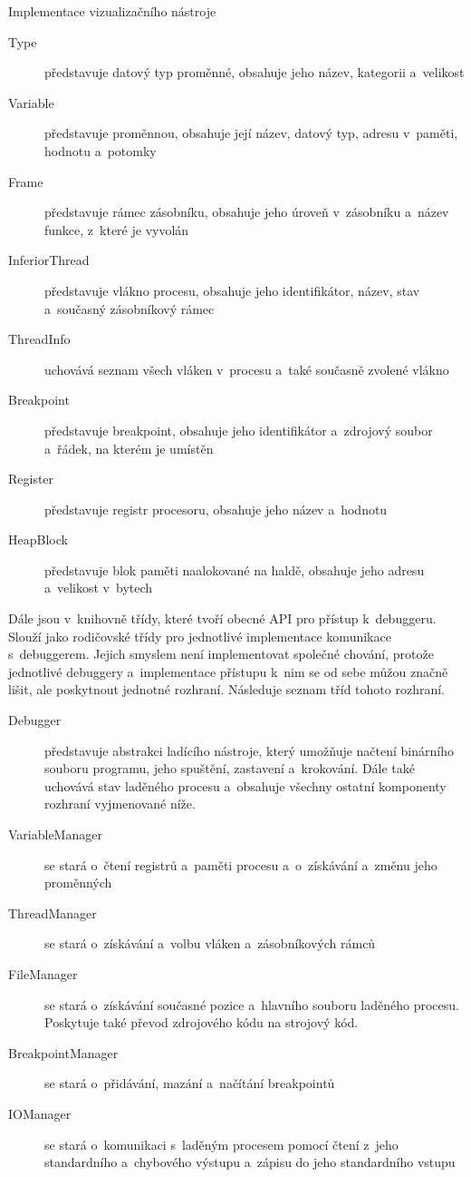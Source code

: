 \documentclass[czech,bachelor,male,python,dept460,hidelinks]{diploma}						%
\newcommand{\parspace}[1][]{
	\ifthenelse{\isempty{#1}}{\vspace{0mm}}{\vspace{#1}}
	\par
}
\begin{document}
\begin{section}{Implementace vizualizačního nástroje}
		\begin{description}
			\item[Type] představuje datový typ proměnné, obsahuje jeho název, kategorii a~velikost
			\item[Variable] představuje proměnnou, obsahuje její název, datový typ, adresu v~paměti, hodnotu a~potomky
			\item[Frame] představuje rámec zásobníku, obsahuje jeho úroveň v~zásobníku a~název funkce, z~které je vyvolán
			\item[InferiorThread] představuje vlákno procesu, obsahuje jeho identifikátor, název, stav a~současný zásobníkový rámec
			\item[ThreadInfo] uchovává seznam všech vláken v~procesu a~také současně zvolené vlákno
			\item[Breakpoint] představuje breakpoint, obsahuje jeho identifikátor a~zdrojový soubor a~řádek, na kterém je umístěn
			\item[Register] představuje registr procesoru, obsahuje jeho název a~hodnotu
			\item[HeapBlock] představuje blok paměti naalokované na haldě, obsahuje jeho adresu a~velikost v~bytech
		\end{description}
		
		\parspace Dále jsou v~knihovně třídy, které tvoří obecné API pro přístup k~debuggeru. Slouží jako rodičovské třídy pro jednotlivé implementace
		komunikace s~debuggerem. Jejich smyslem není implementovat společné chování, protože jednotlivé debuggery a~implementace přístupu k~nim
		se od sebe můžou značně lišit, ale poskytnout jednotné rozhraní. Následuje seznam tříd tohoto rozhraní.
		
		\begin{description}
			\item[Debugger] představuje abstrakci ladícího nástroje, který umožňuje načtení binárního souboru programu, jeho spuštění, zastavení
			a~krokování. Dále také uchovává stav laděného procesu a~obsahuje všechny ostatní komponenty rozhraní vyjmenované níže.
			\item[VariableManager] se stará o~čtení registrů a~paměti procesu a~o~získávání a~změnu jeho proměnných
			\item[ThreadManager] se stará o~získávání a~volbu vláken a~zásobníkových rámců
			\item[FileManager] se stará o~získávání současné pozice a~hlavního souboru laděného procesu. Poskytuje také převod zdrojového kódu
			na strojový kód.
			\item[BreakpointManager] se stará o~přidávání, mazání a~načítání breakpointů
			\item[IOManager] se stará o~komunikaci s~laděným procesem pomocí čtení z~jeho standardního a~chybového výstupu a~zápisu do jeho standardního vstupu
		\end{description}
		

\end{section}
\end{document}
